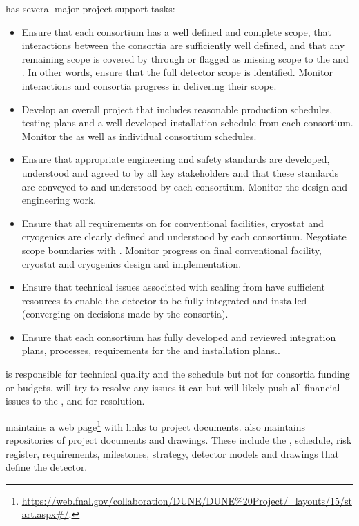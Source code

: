  has several major project support tasks:
\begin{itemize}
\item Ensure that each consortium has a well defined and complete
  scope, that interactions between the consortia are sufficiently well
  defined, and that any remaining scope is covered by 
  through  or flagged as missing scope to the
   and . In other words, ensure that the full
  detector scope is identified. Monitor interactions and consortia
  progress in delivering their scope.
\item Develop an overall project 
  that includes reasonable production schedules, testing plans and a
  well developed installation schedule from each consortium. Monitor
  the  as well as individual consortium schedules.
\item Ensure that appropriate engineering and safety standards are
  developed, understood and agreed to by all key stakeholders and that these
  standards are conveyed to and understood by each
  consortium. Monitor the design and engineering work.
\item Ensure that all  requirements on  for
  conventional facilities, cryostat and cryogenics are clearly
  defined and understood by each consortium. Negotiate scope
  boundaries with . Monitor  progress on
  final conventional facility, cryostat and cryogenics
  design and implementation.
\item Ensure that technical issues associated with scaling from
   have sufficient resources to enable the detector to be fully integrated and
  installed (converging on
  decisions made by the consortia).
\item Ensure that each consortium has fully developed and reviewed
  integration plans,  processes, requirements for
  the  and installation plans..
\end{itemize}

 is responsible for technical quality and the schedule but
not for consortia funding or budgets.   will try to resolve
any issues it can but will likely push all financial issues to the
,  and  for resolution.

 maintains a web
page\footnote{\url{https://web.fnal.gov/collaboration/DUNE/DUNE\%20Project/\_layouts/15/start.aspx\#/}.}
with links to project documents.  also maintains
repositories of project documents and drawings. These include the
, schedule, risk register, requirements, milestones,
strategy, detector models and drawings that define the 
detector.

